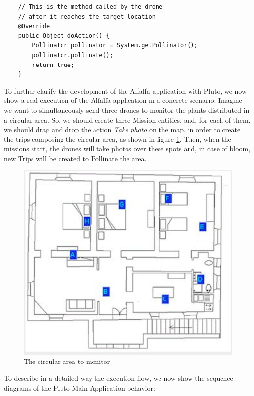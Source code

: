 \begin{lstlisting}
	// This is the method called by the drone
	// after it reaches the target location
	@Override
	public Object doAction() {
		Pollinator pollinator = System.getPollinator();
		pollinator.pollinate();
		return true;
	}
\end{lstlisting}


To further clarify the development of the Alfalfa\cite{alfalfa} application with Pluto, we now show a real execution of the Alfalfa application in a concrete scenario:
Imagine we want to simultaneously send three drones to monitor the plants distributed in a circular area.
So, we should create three Mission entities, and, for each of them, we should drag and drop the action \textit{Take photo} on the map, in order to create the trips composing the circular area, as shown in figure \ref{fig:alfalfaArea}. Then, when the missions start, the drones will take photos over these spots and, in case of bloom, new Trips will be created to Pollinate the area.

\begin{figure}[H]
  \centering
  \includegraphics[width=\linewidth]{pictures/alfalfaArea.png}
  \caption{The circular area to monitor}
  \label{fig:alfalfaArea}
\end{figure}


To describe in a detailed way the execution flow, we now show the sequence diagrams of the Pluto Main Application behavior:
\\

